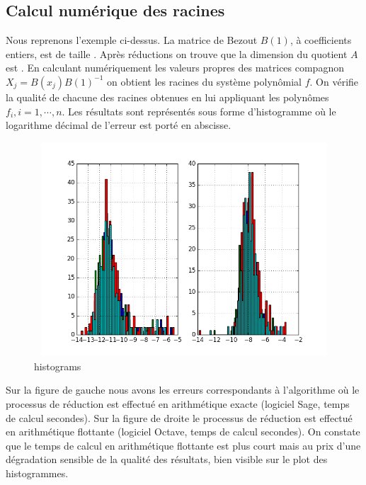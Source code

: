 \documentclass{standalone}
\begin{document}
  \subsection{Calcul numérique des racines}
  Nous reprenons l'exemple ci-dessus. La matrice de Bezout $B(1)$, à coefficients entiers, est de taille . Après réductions on trouve que la dimension du quotient $A$ est . En calculant numériquement les valeurs propres des matrices compagnon $X_j = B(x_j)B(1)^{-1}$ on obtient les racines du système polynômial $f$. On vérifie la qualité de chacune des racines obtenues en lui appliquant les polynômes $f_i, i=1,\cdots,n$. Les résultats sont représentés sous forme d'histogramme o\`u le logarithme décimal de l'erreur est porté en abscisse.
\begin{figure}[!ht]
  \includegraphics[height=8cm, width=1.2\textwidth]{../png/roots.png}
  \caption{histograms}
\end{figure}
Sur la figure de gauche nous avons les erreurs correspondants à l'algorithme o\`u le processus de réduction est effectué en arithmétique exacte (logiciel Sage, temps de calcul
 secondes). Sur la figure de droite le processus de réduction est effectué en arithmétique flottante (logiciel Octave, temps de calcul
 secondes). On constate que le temps de calcul en arithmétique flottante est plus court mais au prix d'une dégradation sensible de la qualité des résultats, bien visible sur le plot des histogrammes.
\end{document}
